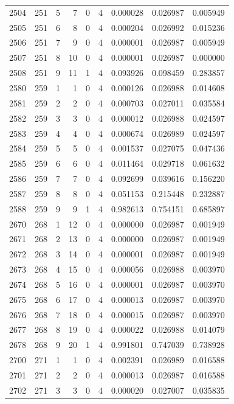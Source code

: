 \begin{longtable}{rrrrrrrrr}
2504 & 251 & 5 & 7 & 0 & 4 & 0.000028 & 0.026987 & 0.005949 \\
2505 & 251 & 6 & 8 & 0 & 4 & 0.000204 & 0.026992 & 0.015236 \\
2506 & 251 & 7 & 9 & 0 & 4 & 0.000001 & 0.026987 & 0.005949 \\
2507 & 251 & 8 & 10 & 0 & 4 & 0.000001 & 0.026987 & 0.000000 \\
2508 & 251 & 9 & 11 & 1 & 4 & 0.093926 & 0.098459 & 0.283857 \\
2580 & 259 & 1 & 1 & 0 & 4 & 0.000126 & 0.026988 & 0.014608 \\
2581 & 259 & 2 & 2 & 0 & 4 & 0.000703 & 0.027011 & 0.035584 \\
2582 & 259 & 3 & 3 & 0 & 4 & 0.000012 & 0.026988 & 0.024597 \\
2583 & 259 & 4 & 4 & 0 & 4 & 0.000674 & 0.026989 & 0.024597 \\
2584 & 259 & 5 & 5 & 0 & 4 & 0.001537 & 0.027075 & 0.047436 \\
2585 & 259 & 6 & 6 & 0 & 4 & 0.011464 & 0.029718 & 0.061632 \\
2586 & 259 & 7 & 7 & 0 & 4 & 0.092699 & 0.039616 & 0.156220 \\
2587 & 259 & 8 & 8 & 0 & 4 & 0.051153 & 0.215448 & 0.232887 \\
2588 & 259 & 9 & 9 & 1 & 4 & 0.982613 & 0.754151 & 0.685897 \\
2670 & 268 & 1 & 12 & 0 & 4 & 0.000000 & 0.026987 & 0.001949 \\
2671 & 268 & 2 & 13 & 0 & 4 & 0.000000 & 0.026987 & 0.001949 \\
2672 & 268 & 3 & 14 & 0 & 4 & 0.000001 & 0.026987 & 0.001949 \\
2673 & 268 & 4 & 15 & 0 & 4 & 0.000056 & 0.026988 & 0.003970 \\
2674 & 268 & 5 & 16 & 0 & 4 & 0.000001 & 0.026987 & 0.003970 \\
2675 & 268 & 6 & 17 & 0 & 4 & 0.000013 & 0.026987 & 0.003970 \\
2676 & 268 & 7 & 18 & 0 & 4 & 0.000015 & 0.026987 & 0.003970 \\
2677 & 268 & 8 & 19 & 0 & 4 & 0.000022 & 0.026988 & 0.014079 \\
2678 & 268 & 9 & 20 & 1 & 4 & 0.991801 & 0.747039 & 0.738928 \\
2700 & 271 & 1 & 1 & 0 & 4 & 0.002391 & 0.026989 & 0.016588 \\
2701 & 271 & 2 & 2 & 0 & 4 & 0.000013 & 0.026987 & 0.016588 \\
2702 & 271 & 3 & 3 & 0 & 4 & 0.000020 & 0.027007 & 0.035835 \\

\end{longtable}
